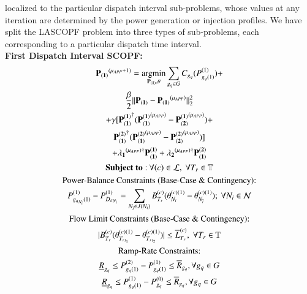 \documentclass[preprint,12pt,3p]{elsarticle}
\begin{document}
localized to the particular dispatch interval sub-problems, whose values at any iteration are determined by the power generation or injection profiles. We have split the LASCOPF problem into three types of sub-problems, each corresponding to a particular dispatch time interval.\\
\textbf{First Dispatch Interval SCOPF:}
\begin{subequations}\label{Look-Ahead_General_First_Interval_Angle}
\begin{gather}
\mathbf{P_{(1)}}^{(\mu_{APP}+1)}=\mathop{\rm argmin}_{\mathbf{P_{(1)}},\theta} \sum_{{g_q}\in G}C_{g_q}(P_{{g_q}(1)}^{(1)})+\notag\\\frac{\beta}{2}||\mathbf{P_{(1)}}-\mathbf{P_{(1)}}^{(\mu_{APP})}||_2^2\notag\\+\gamma[\mathbf{P_{(1)}^{(1)}}^{\dagger}(\mathbf{P_{(1)}^{(1)}}^{(\mu_{APP})}-\mathbf{P_{(2)}^{(1)}}^{(\mu_{APP})})+\notag\\\mathbf{P_{(1)}^{(2)}}^{\dagger}(\mathbf{P_{(1)}^{(2)}}^{(\mu_{APP})}-\mathbf{P_{(2)}^{(2)}}^{(\mu_{APP})})]\notag\\+\mathbf{\lambda_1}^{(\mu_{APP})\dagger}\mathbf{P_{(1)}^{(1)}}+\mathbf{\lambda_2}^{(\mu_{APP})\dagger}\mathbf{P_{(1)}^{(2)}}\label{first_Look-Ahead_General_First_Interval_Angle}\\
\mathbf{Subject\;to:}\:\forall(c)\in\mathcal{L},\;\forall T_r\in \mathbb{T}\notag\\
\text{Power-Balance Constraints (Base-Case \& Contingency):}\notag\\
P_{{g_q}_{N_i}(1)}^{(1)}-P_{{D_d}_{N_i}}^{(1)}=\sum_{N_{\overline{i}}\in{J(N_i)}}B_{T_r}^{(c)}(\theta_{N_i}^{(c)(1)}-\theta_{N_{\overline{i}}}^{(c)(1)});\ \forall{{N_i}\in\mathcal{N}}\label{secondA_Look-Ahead_General_First_Interval_Angle}\\
\text{Flow Limit Constraints (Base-Case \& Contingency):}\notag\\
|B_{T_r}^{(c)}(\theta_{{T_r}_{t_1}}^{(c)(1)}-\theta_{{T_r}_{t_2}}^{(c)(1)})|\leq{{\overline{L}}_{T_r}^{(c)}},\;\forall{T_r\in{\mathbb{T}}}\label{third1_Look-Ahead_General_First_Interval_Angle}\\
\text{Ramp-Rate Constraints:}\notag\\
\underline{R}_{g_q}\leq P_{{g_q}(1)}^{(2)}-P_{{g_q}(1)}^{(1)}\leq \overline{R}_{g_q},\forall {g_q}\in G\label{fourth_Look-Ahead_General_First_Interval_Angle}\\
\underline{R}_{g_q}\leq P_{{g_q}(1)}^{(1)}-P_{g_q}^{(0)}\leq \overline{R}_{g_q},\forall {g_q}\in G\label{fifth_Look-Ahead_General_First_Interval_Angle}
\end{gather}
\end{subequations}
\end{document}
